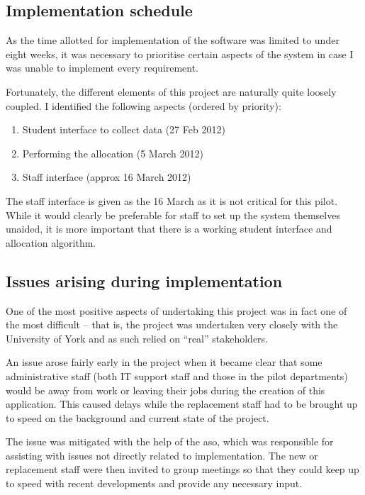 \documentclass[]{scrartcl}
\begin{document}
\subsection{Implementation schedule}

As the time allotted for implementation of the software was limited to under
eight weeks, it was necessary to prioritise certain aspects of the system in
case I was unable to implement every requirement.

Fortunately, the different elements of this project are naturally quite
loosely coupled. I identified the following aspects (ordered by priority):

\begin{enumerate}
  \item Student interface to collect data (27 Feb 2012)
  \item Performing the allocation (5 March 2012)
  \item Staff interface (approx 16 March 2012)
\end{enumerate}

The staff interface is given as the 16 March as it is not critical for this
pilot. While it would clearly be preferable for staff to set up the system
themselves unaided, it is more important that there is a working student
interface and allocation algorithm.

\subsection{Issues arising during implementation}


One of the most positive aspects of undertaking this project was in fact one
of the most difficult -- that is, the project was undertaken very closely with
the University of York and as such relied on ``real'' stakeholders.

An issue arose fairly early in the project when it became clear that some
administrative staff (both IT support staff and those in the pilot
departments) would be away from work or leaving their jobs during the creation
of this application. This caused delays while the replacement staff had to be
brought up to speed on the background and current state of the project.

The issue was mitigated with the help of the \gls{aso}, which was responsible
for assisting with issues not directly related to implementation. The new or
replacement staff were then invited to group meetings so that they could keep
up to speed with recent developments and provide any necessary input.
\end{document}
